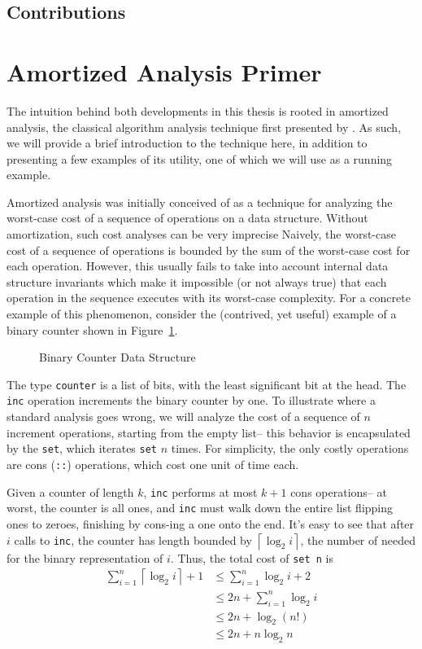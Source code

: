 \subsection{Contributions}


\section{Amortized Analysis Primer}
\label{sec:amortized-primer}
The intuition behind both developments in this thesis is rooted in amortized analysis, the classical algorithm analysis technique first presented by \citet{tarjan:amortized-complexity}. As such, we will provide a brief introduction to the technique here, in addition to presenting a few examples of its utility, one of which we will use as a running example.

Amortized analysis was initially conceived of as a technique for analyzing the worst-case cost of a sequence of operations on a data structure. Without amortization, such cost analyses can be very imprecise Naively, the worst-case cost of a sequence of operations is bounded by the sum of the worst-case cost for each operation. However, this usually fails to take into account internal data structure invariants which make it impossible (or not always true) that each operation in the sequence executes with its worst-case complexity. For a concrete example of this phenomenon, consider the (contrived, yet useful) example of a binary counter shown in Figure~\ref{fig:bin-counter}.

\begin{figure}
  \caption{Binary Counter Data Structure}
  \label{fig:bin-counter}
\end{figure}

The type \texttt{counter} is a list of bits, with the least significant bit at the head. The \texttt{inc} operation increments the binary counter by one. To illustrate where a standard analysis goes wrong, we will analyze the cost of a sequence of $n$ increment operations, starting from the empty list-- this behavior is encapsulated by the \texttt{set}, which iterates \texttt{set} $n$ times. For simplicity, the only costly operations are cons (\texttt{::}) operations, which cost one unit of time each.

Given a counter of length $k$, \texttt{inc} performs at most $k + 1$ cons operations-- at worst, the counter is all ones, and \texttt{inc} must walk down the entire list flipping ones to zeroes, finishing by cons-ing a one onto the end. It's easy to see that after $i$ calls to \texttt{inc}, the counter has length bounded by $\left \lceil{\log_2 i}\right \rceil$, the number of needed for the binary representation of $i$. Thus, the total cost of \texttt{set n} is
\begin{align*}
  \sum_{i=1}^n \left\lceil{\log_2 i}\right \rceil + 1
  &\leq \sum_{i=1}^n \log_2 i + 2\\
  &\leq 2n + \sum_{i=1}^n \log_2 i\\
  &\leq 2n + \log_2(n!)\\
  &\leq 2n + n\log_2 n
\end{align*}

